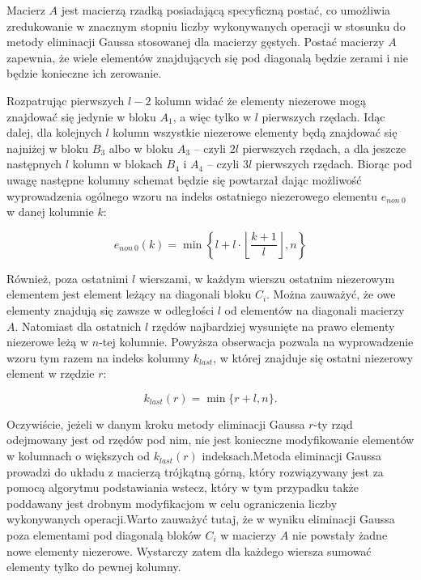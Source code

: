 \documentclass[12pt]{article}
\begin{document}
Macierz $A$ jest macierzą rzadką posiadającą specyficzną postać, co umożliwia zredukowanie w znacznym stopniu liczby wykonywanych operacji w stosunku do metody eliminacji Gaussa stosowanej dla macierzy gęstych. Postać macierzy $A$ zapewnia, że wiele elementów znajdujących się pod diagonalą będzie zerami i nie będzie konieczne ich zerowanie. 

Rozpatrując pierwszych $l-2$ kolumn widać że elementy niezerowe mogą znajdować się jedynie w bloku $A_1$, a więc tylko w $l$ pierwszych rzędach. Idąc dalej, dla kolejnych $l$ kolumn wszystkie niezerowe elementy będą znajdować się najniżej w bloku $B_3$ albo w bloku $A_3$ -- czyli $2l$ pierwszych rzędach, a dla jeszcze następnych $l$ kolumn w blokach $B_4$ i $A_4$ -- czyli $3l$ pierwszych rzędach. Biorąc pod uwagę następne kolumny schemat będzie się powtarzał dając możliwość wyprowadzenia ogólnego wzoru na indeks ostatniego niezerowego elementu $e_{non~0}$ w danej kolumnie $k$:

\begin{equation}
e_{non~0}(k) = \min\left\lbrace l + l \cdot \left \lfloor\frac{k + 1}{l}\right \rfloor, n\right\rbrace
\end{equation}

Również, poza ostatnimi $l$ wierszami, w każdym wierszu ostatnim niezerowym elementem jest element leżący na diagonali bloku $C_i$. Można zauważyć, że owe elementy znajdują się zawsze w odległości $l$ od elementów na diagonali macierzy $A$. Natomiast dla ostatnich $l$ rzędów najbardziej wysunięte na prawo elementy niezerowe leżą w $n$-tej kolumnie. Powyższa obserwacja pozwala na wyprowadzenie wzoru tym razem na indeks kolumny $k_{last}$, w której znajduje się ostatni niezerowy element w rzędzie $r$:

\begin{equation}
k_{last}(r) = \min\{r + l, n\}.
\label{eq:max_col}
\end{equation}

Oczywiście, jeżeli w danym kroku metody eliminacji Gaussa $r$-ty rząd odejmowany jest od rzędów pod nim, nie jest konieczne modyfikowanie elementów w kolumnach o większych od $k_{last}(r)$ indeksach.Metoda eliminacji Gaussa prowadzi do układu z macierzą trójkątną górną, który rozwiązywany jest za pomocą algorytmu podstawiania wstecz, który w tym przypadku także poddawany jest drobnym modyfikacjom w celu ograniczenia liczby wykonywanych operacji.Warto zauważyć tutaj, że w wyniku eliminacji Gaussa poza elementami pod diagonalą bloków $C_i$ w macierzy $A$ nie powstały żadne nowe elementy niezerowe. Wystarczy zatem dla każdego wiersza sumować elementy tylko do pewnej kolumny. 
\end{document}
